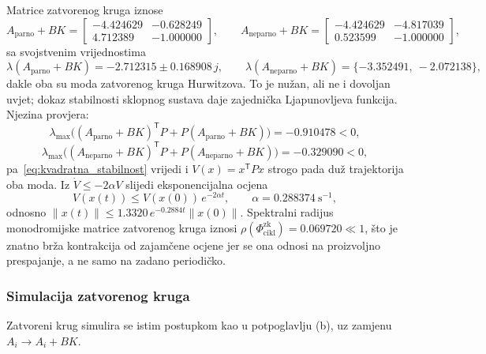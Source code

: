 Matrice zatvorenog kruga iznose
\begin{equation}
A_{\mathrm{parno}} + BK = \begin{bmatrix} -4.424629 & -0.628249 \\ 4.712389 & -1.000000 \end{bmatrix}, \qquad
A_{\mathrm{neparno}} + BK = \begin{bmatrix} -4.424629 & -4.817039 \\ 0.523599 & -1.000000 \end{bmatrix},
\end{equation}
sa svojstvenim vrijednostima
\begin{equation}
\lambda(A_{\mathrm{parno}} + BK) = -2.712315 \pm 0.168908\, j, \qquad
\lambda(A_{\mathrm{neparno}} + BK) = \{-3.352491,\ -2.072138\},
\end{equation}
dakle oba su moda zatvorenog kruga Hurwitzova. To je nužan, ali ne i dovoljan uvjet; dokaz stabilnosti sklopnog sustava daje zajednička Ljapunovljeva funkcija. Njezina provjera:
\begin{equation}
\lambda_{\max}\big( (A_{\mathrm{parno}} + BK)^{\mathsf{T}} P + P (A_{\mathrm{parno}} + BK) \big) = -0.910478 < 0,
\end{equation}
\begin{equation}
\lambda_{\max}\big( (A_{\mathrm{neparno}} + BK)^{\mathsf{T}} P + P (A_{\mathrm{neparno}} + BK) \big) = -0.329090 < 0,
\end{equation}
pa~\eqref{eq:kvadratna_stabilnost} vrijedi i $V(x) = x^{\mathsf{T}} P x$ strogo pada duž trajektorija oba moda. Iz $\dot{V} \leq -2\alpha V$ slijedi eksponencijalna ocjena
\begin{equation}
V(x(t)) \leq V(x(0))\, e^{-2\alpha t}, \qquad \alpha = 0.288374\ \mathrm{s}^{-1},
\end{equation}
odnosno $\|x(t)\| \leq 1.3320\, e^{-0.2884 t} \|x(0)\|$. Spektralni radijus monodromijske matrice zatvorenog kruga iznosi $\rho(\Phi_{\mathrm{cikl}}^{\mathrm{zk}}) = 0.069720 \ll 1$, što je znatno brža kontrakcija od zajamčene ocjene jer se ona odnosi na proizvoljno prespajanje, a ne samo na zadano periodičko.

\subsubsection{Simulacija zatvorenog kruga}

Zatvoreni krug simulira se istim postupkom kao u potpoglavlju (b), uz zamjenu $A_i \rightarrow A_i + BK$.

